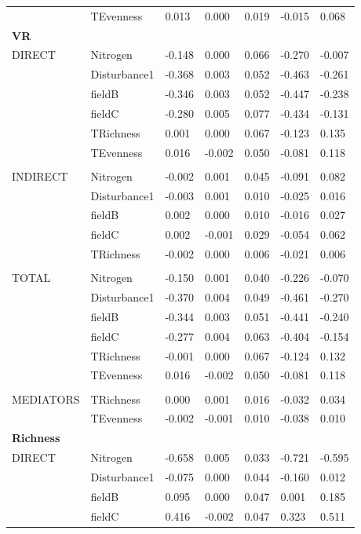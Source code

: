 \begin{longtable}[c]{l l l l l l l }
 & TEvenness & 0.013 & 0.000 & 0.019 & -0.015 & 0.068\\
\textbf{VR} &  &  &  &  &  &\\
\hline
 DIRECT & Nitrogen & -0.148 & 0.000 & 0.066 & -0.270 & -0.007\\
 & Disturbance1 & -0.368 & 0.003 & 0.052 & -0.463 & -0.261\\
 & fieldB & -0.346 & 0.003 & 0.052 & -0.447 & -0.238\\
 & fieldC & -0.280 & 0.005 & 0.077 & -0.434 & -0.131\\
 & TRichness & 0.001 & 0.000 & 0.067 & -0.123 & 0.135\\
 & TEvenness & 0.016 & -0.002 & 0.050 & -0.081 & 0.118\\
 & & & & & & \\
 INDIRECT & Nitrogen & -0.002 & 0.001 & 0.045 & -0.091 & 0.082\\
 & Disturbance1 & -0.003 & 0.001 & 0.010 & -0.025 & 0.016\\
 & fieldB & 0.002 & 0.000 & 0.010 & -0.016 & 0.027\\
 & fieldC & 0.002 & -0.001 & 0.029 & -0.054 & 0.062\\
 & TRichness & -0.002 & 0.000 & 0.006 & -0.021 & 0.006\\
 & & & & & & \\
 TOTAL & Nitrogen & -0.150 & 0.001 & 0.040 & -0.226 & -0.070\\
 & Disturbance1 & -0.370 & 0.004 & 0.049 & -0.461 & -0.270\\
 & fieldB & -0.344 & 0.003 & 0.051 & -0.441 & -0.240\\
 & fieldC & -0.277 & 0.004 & 0.063 & -0.404 & -0.154\\
 & TRichness & -0.001 & 0.000 & 0.067 & -0.124 & 0.132\\
 & TEvenness & 0.016 & -0.002 & 0.050 & -0.081 & 0.118\\
 & & & & & & \\
 MEDIATORS &TRichness & 0.000 & 0.001 & 0.016 & -0.032 & 0.034\\
 & TEvenness & -0.002 & -0.001 & 0.010 & -0.038 & 0.010\\
\textbf{Richness} &  &  &  &  &  &\\
\hline
 DIRECT & Nitrogen & -0.658 & 0.005 & 0.033 & -0.721 & -0.595\\
 & Disturbance1 & -0.075 & 0.000 & 0.044 & -0.160 & 0.012\\
 & fieldB & 0.095 & 0.000 & 0.047 & 0.001 & 0.185\\
 & fieldC & 0.416 & -0.002 & 0.047 & 0.323 & 0.511\\

\end{longtable}
